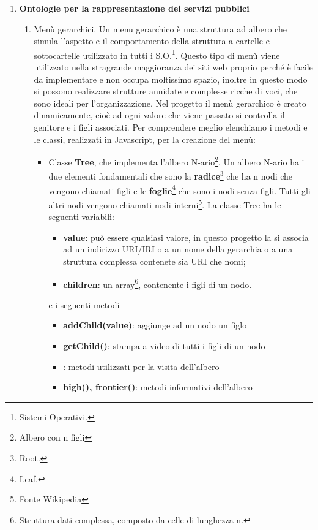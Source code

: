 \documentclass[a4paper,11pt]{article}
\begin{document}
\begin{enumerate}
		\item \LARGE{\textbf{Ontologie per la rappresentazione dei servizi pubblici}}
		\begin{enumerate}[label*=\arabic*.]
			\Large
			\item Menù gerarchici.\newline
			Un menu gerarchico è una struttura ad albero che simula l'aspetto e il comportamento della struttura a cartelle e sottocartelle utilizzato in tutti i S.O.\footnote{Sistemi Operativi.}. Questo tipo di menù viene utilizzato nella stragrande maggioranza dei siti web proprio perché è facile da implementare e non occupa moltissimo spazio, inoltre in questo modo si possono realizzare strutture annidate e complesse ricche di voci, che sono ideali per l'organizzazione.\newline 
Nel progetto il menù gerarchico è creato dinamicamente, cioè ad ogni valore che viene passato si controlla il genitore e i figli associati.
Per comprendere meglio elenchiamo i metodi e le classi, realizzati in Javascript, per la creazione del menù:

	\begin{itemize}
		\item Classe \textbf{Tree}, che implementa l'albero N-ario\footnote{Albero con n figli}. Un albero N-ario ha i due elementi fondamentali che sono la \textbf{radice}\footnote{Root.} che ha n nodi che vengono chiamati figli e le \textbf{foglie}\footnote{Leaf.} che sono i nodi senza figli. Tutti gli altri nodi vengono chiamati nodi interni\footnote{Fonte Wikipedia}.
		La classe Tree	ha le seguenti variabili:
		\begin{itemize}
			\item \textbf{value}: può essere qualsiasi valore, in questo progetto la si associa ad un indirizzo URI/IRI o a un nome della gerarchia o a una struttura complessa contenete sia URI che nomi;
			\item \textbf{children}: un array\footnote{Struttura dati complessa, composto da celle di lunghezza n.}, contenente i figli di un nodo.
		\end{itemize}
		e i seguenti metodi
		\begin{itemize}
			\item \textbf{addChild(value)}: aggiunge ad un nodo un figlo
			\item \textbf{getChild()}: stampa a video di tutti i figli di un nodo
			\item {}: metodi utilizzati per la visita dell'albero
			\item \textbf{high(), frontier()}: metodi informativi dell'albero
		\end{itemize}
	

\end{itemize}
\end{enumerate}
\end{enumerate}
\end{document}
